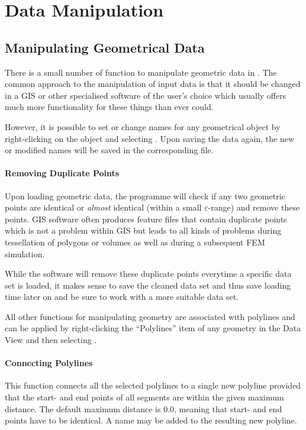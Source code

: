 \chapter{Data Manipulation}

\section{Manipulating Geometrical Data}

There is a small number of function to manipulate geometric data in \ogs. The common approach to the manipulation of \ogs input data is that it should be changed in a GIS or other specialised software of the user's choice which usually offers much more functionality for these things than \ogs ever could.

However, it is possible to set or change names for any geometrical object by right-clicking on the object and selecting . Upon saving the data again, the new or modified names will be saved in the corresponding file.

\subsubsection{Removing Duplicate Points}

Upon loading geometric data, the programme will check if any two geometric points are identical or \emph{almost} identical (within a small $\varepsilon$-range) and remove these points. GIS software often produces feature files that contain duplicate points which is not a problem within GIS but leads to all kinds of problems during tessellation of polygons or volumes as well as during a subsequent FEM simulation.

While the software will remove these duplicate points everytime a specific data set is loaded, it makes sense to save the cleaned data set and thus save loading time later on and be sure to work with a more suitable data set.

\bigskip
 
All other functions for manipulating geometry are associated with polylines and can be applied by right-clicking the ``Polylines'' item of any geometry in the Data View and then selecting .

\subsubsection{Connecting Polylines}
This function connects all the selected polylines to a single new polyline provided that the start- and end points of all segments are within the given maximum distance. The default maximum distance is $0.0$, meaning that start- and end points have to be identical. A name may be added to the resulting new polyline.

